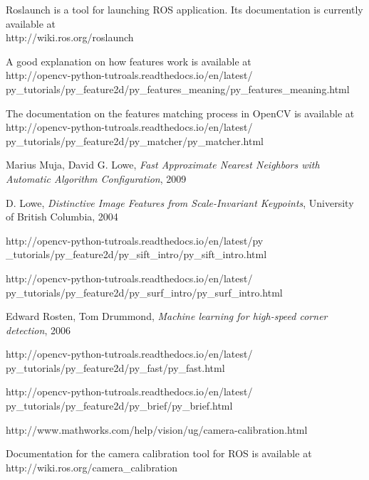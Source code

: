 \documentclass[12pt]{article}
\begin{document}
\begin{thebibliography}{9}
Roslaunch is a tool for launching ROS application.
Its documentation is currently available at \\
http://wiki.ros.org/roslaunch

A good explanation on how features work is available at \\
http://opencv-python-tutroals.readthedocs.io/en/latest/\\
py\_tutorials/py\_feature2d/py\_features\_meaning/py\_features\_meaning.html

The documentation on the features matching process in OpenCV is available at \\
http://opencv-python-tutroals.readthedocs.io/en/latest/\\
py\_tutorials/py\_feature2d/py\_matcher/py\_matcher.html

Marius Muja, David G. Lowe, \emph{Fast Approximate Nearest Neighbors with Automatic Algorithm Configuration}, 2009

D. Lowe, \emph{Distinctive Image Features from Scale-Invariant Keypoints},
University of British Columbia, 2004

http://opencv-python-tutroals.readthedocs.io/en/latest/py\\
\_tutorials/py\_feature2d/py\_sift\_intro/py\_sift\_intro.html

http://opencv-python-tutroals.readthedocs.io/en/latest/\\
py\_tutorials/py\_feature2d/py\_surf\_intro/py\_surf\_intro.html

Edward Rosten, Tom Drummond, \emph{Machine learning for high-speed corner detection}, 2006

http://opencv-python-tutroals.readthedocs.io/en/latest/\\
py\_tutorials/py\_feature2d/py\_fast/py\_fast.html

http://opencv-python-tutroals.readthedocs.io/en/latest/\\
py\_tutorials/py\_feature2d/py\_brief/py\_brief.html

http://www.mathworks.com/help/vision/ug/camera-calibration.html

Documentation for the camera calibration tool for ROS is available at \\
http://wiki.ros.org/camera\_calibration


    \end{thebibliography}
\end{document}
